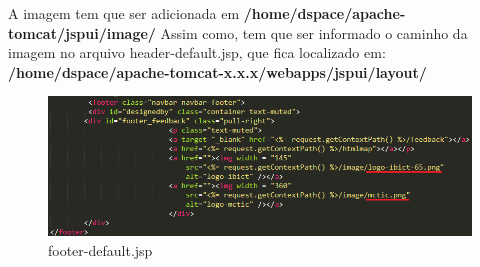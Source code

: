 \documentclass[12pt,hidelinks]{article}
\begin{document}
\newpage 
A imagem tem que ser adicionada em \textbf{/home/dspace/apache-tomcat/jspui/image/} 
Assim como, tem que ser informado o caminho da imagem no arquivo header-default.jsp, que fica localizado em:  \textbf{/home/dspace/apache-tomcat-x.x.x/webapps/jspui/layout/}
    \begin{figure}[!htp]
        \centering
        \includegraphics[scale=0.5]{figura/footer-default.png}
        \caption{footer-default.jsp}
        \label{Rotulo}
    \end{figure}
    
\end{document}
